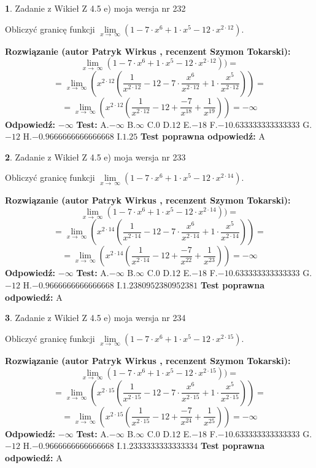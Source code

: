 \documentclass[12pt, a4paper]{article}
\theoremstyle{definition} %
\newtheorem{zad}{}
\newcommand{\zadStart}[1]{\begin{zad}#1\newline}
\newcommand{\zadStop}{\end{zad}}
\newcommand{\rozwStart}[2]{\noindent \textbf{Rozwiązanie (autor #1 , recenzent #2): }\newline}
\newcommand{\rozwStop}{\newline}
\newcommand{\odpStart}{\noindent \textbf{Odpowiedź:}\newline}
\newcommand{\odpStop}{\newline}
\newcommand{\testStart}{\noindent \textbf{Test:}\newline}
\newcommand{\testStop}{\newline}
\newcommand{\kluczStart}{\noindent \textbf{Test poprawna odpowiedź:}\newline}
\newcommand{\kluczStop}{\newline}
\begin{document}
\zadStart{Zadanie z Wikieł Z 4.5 e) moja wersja nr 232}


Obliczyć granicę funkcji  $\lim\limits_{x\to\ \infty}(1 - 7 \cdot x^{6}+1 \cdot x^{5}- 12 \cdot x^{2\cdot12})$.
\zadStop
\rozwStart{Patryk Wirkus}{Szymon Tokarski}
$$\lim\limits_{x\to\ \infty}(1 - 7 \cdot x^{6}+1 \cdot x^{5}- 12 \cdot x^{2\cdot12}))=$$
$$=\lim\limits_{x\to\ \infty}(x^{2\cdot12}(\frac{1}{x^{2\cdot12}}-12 -7 \cdot \frac{x^{6}}{x^{2\cdot12}}+1 \cdot \frac{x^{5}}{x^{2\cdot12}}))=$$
$$=\lim\limits_{x\to\ \infty}(x^{2\cdot12}(\frac{1}{x^{2\cdot12}}-12 + \frac{-7}{x^{18}}+ \frac{1}{x^{19}}))=-\infty$$
\rozwStop
\odpStart
$-\infty$
\odpStop
\testStart
A.$-\infty$ B.$\infty$ C.$0$ D.$12$ E.$-18$
F.$-10.633333333333333$ G.$-12$
H.$-0.9666666666666668$
I.$1.25$
\testStop
\kluczStart
A
\kluczStop



\zadStart{Zadanie z Wikieł Z 4.5 e) moja wersja nr 233}


Obliczyć granicę funkcji  $\lim\limits_{x\to\ \infty}(1 - 7 \cdot x^{6}+1 \cdot x^{5}- 12 \cdot x^{2\cdot14})$.
\zadStop
\rozwStart{Patryk Wirkus}{Szymon Tokarski}
$$\lim\limits_{x\to\ \infty}(1 - 7 \cdot x^{6}+1 \cdot x^{5}- 12 \cdot x^{2\cdot14}))=$$
$$=\lim\limits_{x\to\ \infty}(x^{2\cdot14}(\frac{1}{x^{2\cdot14}}-12 -7 \cdot \frac{x^{6}}{x^{2\cdot14}}+1 \cdot \frac{x^{5}}{x^{2\cdot14}}))=$$
$$=\lim\limits_{x\to\ \infty}(x^{2\cdot14}(\frac{1}{x^{2\cdot14}}-12 + \frac{-7}{x^{22}}+ \frac{1}{x^{23}}))=-\infty$$
\rozwStop
\odpStart
$-\infty$
\odpStop
\testStart
A.$-\infty$ B.$\infty$ C.$0$ D.$12$ E.$-18$
F.$-10.633333333333333$ G.$-12$
H.$-0.9666666666666668$
I.$1.2380952380952381$
\testStop
\kluczStart
A
\kluczStop



\zadStart{Zadanie z Wikieł Z 4.5 e) moja wersja nr 234}


Obliczyć granicę funkcji  $\lim\limits_{x\to\ \infty}(1 - 7 \cdot x^{6}+1 \cdot x^{5}- 12 \cdot x^{2\cdot15})$.
\zadStop
\rozwStart{Patryk Wirkus}{Szymon Tokarski}
$$\lim\limits_{x\to\ \infty}(1 - 7 \cdot x^{6}+1 \cdot x^{5}- 12 \cdot x^{2\cdot15}))=$$
$$=\lim\limits_{x\to\ \infty}(x^{2\cdot15}(\frac{1}{x^{2\cdot15}}-12 -7 \cdot \frac{x^{6}}{x^{2\cdot15}}+1 \cdot \frac{x^{5}}{x^{2\cdot15}}))=$$
$$=\lim\limits_{x\to\ \infty}(x^{2\cdot15}(\frac{1}{x^{2\cdot15}}-12 + \frac{-7}{x^{24}}+ \frac{1}{x^{25}}))=-\infty$$
\rozwStop
\odpStart
$-\infty$
\odpStop
\testStart
A.$-\infty$ B.$\infty$ C.$0$ D.$12$ E.$-18$
F.$-10.633333333333333$ G.$-12$
H.$-0.9666666666666668$
I.$1.2333333333333334$
\testStop
\kluczStart
A
\kluczStop
\end{document}
